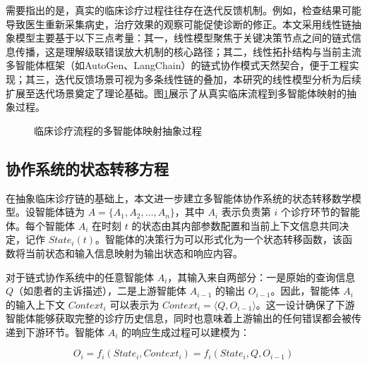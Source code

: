 需要指出的是，真实的临床诊疗过程往往存在迭代反馈机制。例如，检查结果可能导致医生重新采集病史，治疗效果的观察可能促使诊断的修正。本文采用线性链抽象模型主要基于以下三点考量：其一，线性模型聚焦于关键决策节点之间的链式信息传播，这是理解级联错误放大机制的核心路径；其二，线性拓扑结构与当前主流多智能体框架（如AutoGen、LangChain）的链式协作模式天然契合，便于工程实现；其三，迭代反馈场景可视为多条线性链的叠加，本研究的线性模型分析为后续扩展至迭代场景奠定了理论基础。图\ref{fig:clinical_abstraction}展示了从真实临床流程到多智能体映射的抽象过程。

\begin{figure}[htbp]
\centering
{}
\caption{临床诊疗流程的多智能体映射抽象过程}
\label{fig:clinical_abstraction}
\end{figure}

\subsection{协作系统的状态转移方程}
\label{subsec:state_transition}

在抽象临床诊疗链的基础上，本文进一步建立多智能体协作系统的状态转移数学模型。设智能体链为 $A = \{A_1, A_2, \ldots, A_n\}$，其中 $A_i$ 表示负责第 $i$ 个诊疗环节的智能体。每个智能体 $A_i$ 在时刻 $t$ 的状态由其内部参数配置和当前上下文信息共同决定，记作 $State_i(t)$。智能体的决策行为可以形式化为一个状态转移函数，该函数将当前状态和输入信息映射为输出状态和响应内容。

对于链式协作系统中的任意智能体 $A_i$，其输入来自两部分：一是原始的查询信息 $Q$（如患者的主诉描述），二是上游智能体 $A_{i-1}$ 的输出 $O_{i-1}$。因此，智能体 $A_i$ 的输入上下文 $Context_i$ 可以表示为 $Context_i = \langle Q, O_{i-1} \rangle$。这一设计确保了下游智能体能够获取完整的诊疗历史信息，同时也意味着上游输出的任何错误都会被传递到下游环节。智能体 $A_i$ 的响应生成过程可以建模为：

\begin{equation}
O_i = f_i(State_i, Context_i) = f_i(State_i, Q, O_{i-1})
\label{eq:response_generation}
\end{equation}

